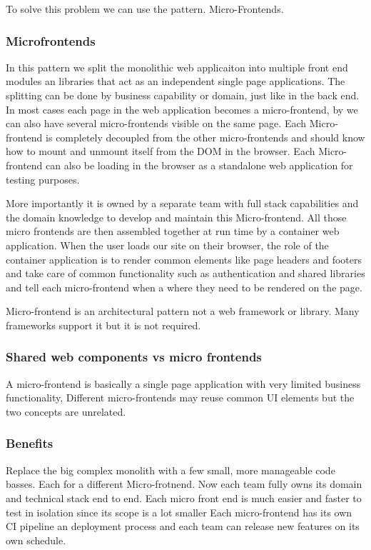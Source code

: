 \documentclass[a4paper, 11pt]{book}
\begin{document}
    To solve this problem we can use the pattern.
    Micro-Frontends.

    \subsubsection{Microfrontends}
    In this pattern we split the monolithic web applicaiton into multiple front end modules an libraries that act as an independent single page applications.
    The splitting can be done by business capability or domain, just like in the back end.
    In most cases each page in the web application becomes a micro-frontend, by we can also have several micro-frontends visible on the same page.
    Each Micro-frontend is completely decoupled from the other micro-frontends and should know how to mount and unmount itself from the DOM in the browser.
    Each Micro-frontend can also be loading in the browser as a standalone web application for testing purposes.

    More importantly it is owned by a separate team with full stack capabilities and the domain knowledge to develop and maintain this Micro-frontend.
    All those micro frontends are then assembled together at run time by a container web application.
    When the user loads our site on their browser, the role of the container application is to render common elements like page headers and footers and take care of common functionality such as authentication and shared libraries and tell each micro-frontend when a where they need to be rendered on the page.

    Micro-frontend is an architectural pattern not a web framework or library.
    Many frameworks support it but it is not required.

    \subsubsection{Shared web components vs micro frontends}
    A micro-frontend is basically a single page application with very limited business functionality,
    Different micro-frontends may reuse common UI elements but the two concepts are unrelated.

    \subsubsection{Benefits}
    Replace the big complex monolith with a few small, more manageable code basses.
    Each for a different Micro-frotnend.
    Now each team fully owns its domain and technical stack end to end.
    Each micro front end is much easier and faster to test in isolation since its scope is a lot smaller
    Each micro-frontend has its own CI pipeline an deployment process and each team can release new features on its own schedule.
\end{document}
